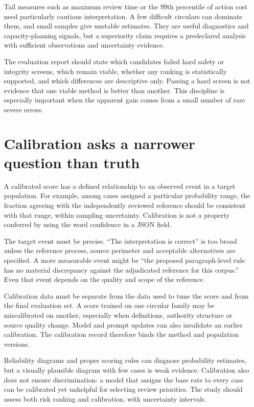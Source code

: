 Tail measures such as maximum review time or the 99th percentile of action cost
need particularly cautious interpretation. A few difficult circulars can dominate
them, and small samples give unstable estimates. They are useful diagnostics and
capacity-planning signals, but a superiority claim requires a predeclared analysis
with sufficient observations and uncertainty evidence.

The evaluation report should state which candidates failed hard safety or
integrity screens, which remain viable, whether any ranking is statistically
supported, and which differences are descriptive only. Passing a hard screen is
not evidence that one viable method is better than another. This discipline is
especially important when the apparent gain comes from a small number of rare
severe errors.

\section{Calibration asks a narrower question than truth}
\label{merge:M09:08}


A calibrated score has a defined relationship to an observed event in a target
population. For example, among cases assigned a particular probability range,
the fraction agreeing with the independently reviewed reference should be
consistent with that range, within sampling uncertainty. Calibration is not a
property conferred by using the word confidence in a JSON field.

The target event must be precise. ``The interpretation is correct'' is too broad
unless the reference process, source perimeter and acceptable alternatives are
specified. A more measurable event might be ``the proposed paragraph-level rule
has no material discrepancy against the adjudicated reference for this corpus.''
Even that event depends on the quality and scope of the reference.

Calibration data must be separate from the data used to tune the score and from
the final evaluation set. A score trained on one circular family may be
miscalibrated on another, especially when definitions, authority structure or
source quality change. Model and prompt updates can also invalidate an earlier
calibration. The calibration record therefore binds the method and population
versions.


Reliability diagrams and proper scoring rules can diagnose probability estimates,
but a visually plausible diagram with few cases is weak evidence. Calibration
also does not ensure discrimination: a model that assigns the base rate to every
case can be calibrated yet unhelpful for selecting review priorities. The study
should assess both risk ranking and calibration, with uncertainty intervals.

